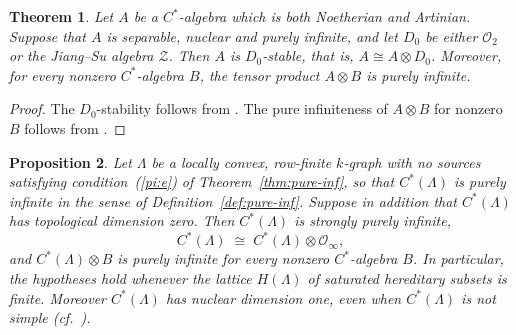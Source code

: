 \documentclass[12pt]{amsart}
\theoremstyle{plain}
\newtheorem{theorem}{Theorem}[section]
\newtheorem{proposition}[theorem]{Proposition}
\theoremstyle{definition}
\theoremstyle{remark}
\begin{document}
\begin{theorem}\label{thm:D0-stable}
Let $A$ be a $C^*$\nobreakdash-algebra which is both Noetherian and Artinian. 
Suppose that $A$ is separable, nuclear and purely infinite, and let $D_0$ be either 
$\mathcal{O}_2$ or the Jiang--Su algebra $\mathcal{Z}$. Then $A$ is $D_0$-stable, 
that is, $A \cong A \otimes D_0$. Moreover, for every nonzero $C^*$\nobreakdash-algebra $B$, 
the tensor product $A \otimes B$ is purely infinite.
\end{theorem}

\begin{proof}
The $D_0$-stability follows from \cite[Theorem~2.4]{PRA1}. 
The pure infiniteness of $A \otimes B$ for nonzero $B$ follows from 
\cite[Proposition~4.7]{KR}.
\end{proof}


\begin{proposition}\label{prop:Oinfty-absorption}
Let $\Lambda$ be a locally convex, row-finite $k$-graph with no sources
satisfying condition~\textup{(\ref{pi:e})} of Theorem~\ref{thm:pure-inf}, so that
$C^*(\Lambda)$ is purely infinite in the sense of
Definition~\ref{def:pure-inf}. Suppose in addition that $C^*(\Lambda)$ has
topological dimension zero. Then $C^*(\Lambda)$ is strongly purely infinite,
\[
C^*(\Lambda) \;\cong\; C^*(\Lambda)\otimes\mathcal O_\infty,
\]
and $C^*(\Lambda)\otimes B$ is purely infinite for every nonzero
$C^*$-algebra $B$. In particular, the hypotheses hold whenever the lattice
$H(\Lambda)$ of saturated hereditary subsets is finite. Moreover
$C^*(\Lambda)$ has nuclear dimension one, even when $C^*(\Lambda)$ is not
simple (cf.\ \cite{RSS}).
\end{proposition}
\end{document}
